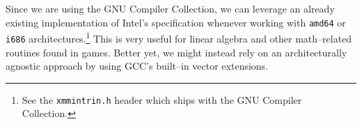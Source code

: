 Since we are using the GNU Compiler Collection, we can leverage an already existing implementation of Intel's specification whenever working with {\tt amd64} or {\tt i686} architectures.\footnote{See the {\tt xmmintrin.h} header which ships with the GNU Compiler Collection.} This is very useful for linear algebra and other math--related routines found in games. Better yet, we might instead rely on an architecturally agnostic approach by using GCC's built--in vector extensions.

